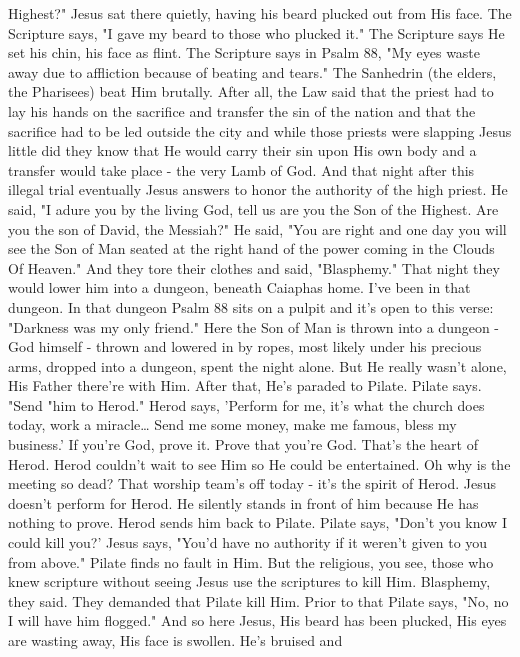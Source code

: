 \documentclass[11pt]{article}
\begin{document}
\begin{description}
Highest?" Jesus sat there
quietly, having his beard plucked out
from His face. The Scripture says, "I gave
my beard to those who plucked
it." The Scripture says He set his chin,
his face as
flint. The Scripture
says in Psalm 88, "My eyes waste away due
to affliction because of beating and
tears." The Sanhedrin (the elders, the
Pharisees) beat Him
brutally. After all, the Law
said that the priest had to lay his
hands on the sacrifice and transfer the
sin of the nation and that the sacrifice
had to be led outside the city and while
those priests were slapping Jesus little
did they know that He would carry their sin upon
His own body and a transfer would take
place - the very Lamb of God.
And that night after this illegal trial
eventually Jesus answers to honor the authority of the
high priest. He said, "I adure you by the
living God, tell us are you the Son of
the Highest. Are you the son of David, the
Messiah?" He said, "You are right and one
day you will see the Son of Man seated
at the right hand of the power coming in
the Clouds Of Heaven." And they tore their clothes and
said, "Blasphemy." That night they would lower
him into a dungeon, beneath Caiaphas home. I've
been in that dungeon. In that dungeon Psalm 88 sits on
a pulpit and it's open to this verse:
"Darkness was my only friend." Here the Son of Man is thrown
into a dungeon - God himself - thrown and lowered in by ropes,
most likely under his precious arms,
dropped into a dungeon, spent the night
alone. But He really wasn't alone, His
Father there're with
Him. After that, He's paraded to
Pilate. Pilate says. "Send "him to Herod."
Herod says, 'Perform for me, it's what the
church does today, work a miracle\ldots{}
Send me some money, make me
famous, bless my
business.' If you're God, prove it. Prove
that you're God. That's the heart of Herod. Herod
couldn't wait to see Him so He could be
entertained. Oh why is the meeting so
dead? That worship team's off today - it's
the spirit of Herod.
Jesus doesn't perform for Herod. He
silently stands in front of him because
He has nothing to
prove. Herod sends him back to
Pilate. Pilate says, "Don't you know I could
kill you?' Jesus says, "You'd have no
authority if it weren't given to you
from above."
Pilate finds no fault in
Him. But the religious, you
see, those who knew scripture without
seeing Jesus use the scriptures to kill
Him. Blasphemy, they
said. They demanded that Pilate kill Him. Prior to that Pilate
says, "No, no I will have him flogged." And
so here Jesus, His beard has been plucked,
His eyes are wasting away, His face is
swollen. He's bruised and

\end{description}
\end{document}
